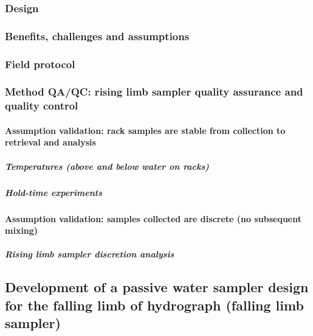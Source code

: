 \documentclass[]{article}
\let\oldparagraph\paragraph
\renewcommand{\paragraph}[1]{\oldparagraph{#1}\mbox{}}
\let\oldsubparagraph\subparagraph
\renewcommand{\subparagraph}[1]{\oldsubparagraph{#1}\mbox{}}
\begin{document}
\subsubsection{Design}\label{design}

\subsubsection{Benefits, challenges and
assumptions}\label{benefits-challenges-and-assumptions}

\subsubsection{Field protocol}\label{field-protocol}

\subsubsection{Method QA/QC: rising limb sampler quality assurance and
quality
control}\label{method-qaqc-rising-limb-sampler-quality-assurance-and-quality-control}

\paragraph{Assumption validation: rack samples are stable from
collection to retrieval and
analysis}\label{assumption-validation-rack-samples-are-stable-from-collection-to-retrieval-and-analysis}

\subparagraph{Temperatures (above and below water on
racks)}\label{temperatures-above-and-below-water-on-racks}

\subparagraph{Hold-time experiments}\label{hold-time-experiments}

\paragraph{Assumption validation: samples collected are discrete (no
subsequent
mixing)}\label{assumption-validation-samples-collected-are-discrete-no-subsequent-mixing}

\subparagraph{Rising limb sampler discretion
analysis}\label{rising-limb-sampler-discretion-analysis}

\subsection{Development of a passive water sampler design for the
falling limb of hydrograph (falling limb
sampler)}\label{development-of-a-passive-water-sampler-design-for-the-falling-limb-of-hydrograph-falling-limb-sampler}
\end{document}
